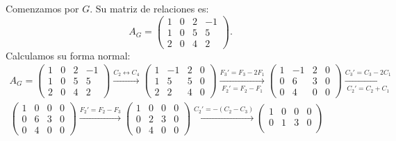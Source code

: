 \begin{ejercicio}
\begin{enumerate}
        Comenzamos por $G$. Su matriz de relaciones es:
        \begin{equation*}
            A_G = \begin{pmatrix}
                1 & 0 & 2 & -1 \\
                1 & 0 & 5 & 5 \\
                2 & 0 & 4 & 2
            \end{pmatrix}.
        \end{equation*}
        Calculamos su forma normal:
        \begin{multline*}
            A_G = \begin{pmatrix}
                1 & 0 & 2 & -1 \\
                1 & 0 & 5 & 5 \\
                2 & 0 & 4 & 2
            \end{pmatrix}
            \xrightarrow{C_2\leftrightarrow C_4}
            \begin{pmatrix}
                1 & -1 & 2 & 0 \\
                1 & 5 & 5 & 0 \\
                2 & 2 & 4 & 0
            \end{pmatrix}
            \xrightarrow[F_2'=F_2-F_1]{F_3'=F_3-2F_1}
            \begin{pmatrix}
                1 & -1 & 2 & 0 \\
                0 & 6 & 3 & 0 \\
                0 & 4 & 0 & 0
            \end{pmatrix}
            \xrightarrow[C_2'=C_2+C_1]{C_3'=C_3-2C_1}\\
            \begin{pmatrix}
                1 & 0 & 0 & 0 \\
                0 & 6 & 3 & 0 \\
                0 & 4 & 0 & 0
            \end{pmatrix}
            \xrightarrow{F_2'=F_2-F_3}
            \begin{pmatrix}
                1 & 0 & 0 & 0 \\
                0 & 2 & 3 & 0 \\
                0 & 4 & 0 & 0
            \end{pmatrix}
            \xrightarrow{C_2'=-(C_2-C_3)}
            \begin{pmatrix}
                1 & 0 & 0 & 0 \\
                0 & 1 & 3 & 0 \\

\end{pmatrix}
\end{multline*}
\end{enumerate}
\end{ejercicio}
